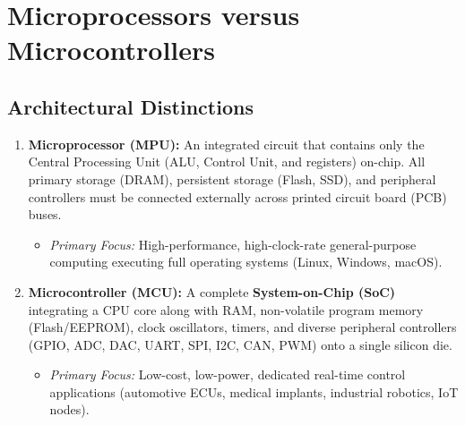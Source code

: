 \section{Microprocessors versus Microcontrollers}
\label{sec:mpu_vs_mcu}

\subsection{Architectural Distinctions}
\begin{enumerate}[label=\bfseries\arabic*.]
    \item \textbf{Microprocessor (MPU):} An integrated circuit that contains only the Central Processing Unit (ALU, Control Unit, and registers) on-chip. All primary storage (DRAM), persistent storage (Flash, SSD), and peripheral controllers must be connected externally across printed circuit board (PCB) buses.
    \begin{itemize}
        \item \textit{Primary Focus:} High-performance, high-clock-rate general-purpose computing executing full operating systems (Linux, Windows, macOS).
    \end{itemize}
    \item \textbf{Microcontroller (MCU):} A complete \textbf{System-on-Chip (SoC)} integrating a CPU core along with RAM, non-volatile program memory (Flash/EEPROM), clock oscillators, timers, and diverse peripheral controllers (GPIO, ADC, DAC, UART, SPI, I2C, CAN, PWM) onto a single silicon die.
    \begin{itemize}
        \item \textit{Primary Focus:} Low-cost, low-power, dedicated real-time control applications (automotive ECUs, medical implants, industrial robotics, IoT nodes).
    \end{itemize}
\end{enumerate}

